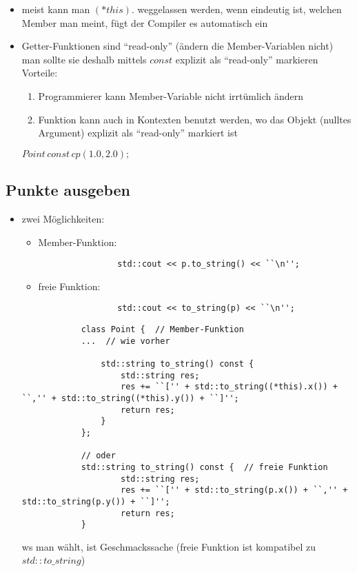 \documentclass{article}
\begin{document}
	 \begin{itemize}
	 	\item meist kann man $(*this).$ weggelassen werden, wenn eindeutig ist, welchen Member man meint, fügt der Compiler es automatisch ein
	 	\item Getter-Funktionen sind ``read-only'' (ändern die Member-Variablen nicht) \\
	 	man sollte sie deshalb mittels $const$ explizit als ``read-only'' markieren \\ Vorteile:
	 	\begin{enumerate}
	 		\item Programmierer kann Member-Variable nicht irrtümlich ändern
	 		\item Funktion kann auch in Kontexten benutzt werden, wo das Objekt (nulltes Argument) explizit als ``read-only'' markiert ist
	 	\end{enumerate}
	 	$Point \, const \, cp(1.0,2.0);$
	 \end{itemize}

\subsection{Punkte ausgeben}

	\begin{itemize}
		\item zwei Möglichkeiten:
		\begin{itemize}
			\item Member-Funktion:
			\begin{lstlisting}
				std::cout << p.to_string() << ``\n'';
			\end{lstlisting}
			\item freie Funktion:
			\begin{lstlisting}
				std::cout << to_string(p) << ``\n'';
			\end{lstlisting}
		\end{itemize}
		\begin{lstlisting}
			class Point {  // Member-Funktion
			...  // wie vorher

				std::string to_string() const {
					std::string res;
					res += ``['' + std::to_string((*this).x()) + ``,'' + std::to_string((*this).y()) + ``]'';
					return res;
				}
			};

			// oder
			std::string to_string() const {  // freie Funktion
					std::string res;
					res += ``['' + std::to_string(p.x()) + ``,'' + std::to_string(p.y()) + ``]'';
					return res;
			}
		\end{lstlisting}
		ws man wählt, ist Geschmackssache (freie Funktion ist kompatibel zu $std::to\_string$)
	\end{itemize}
\end{document}
